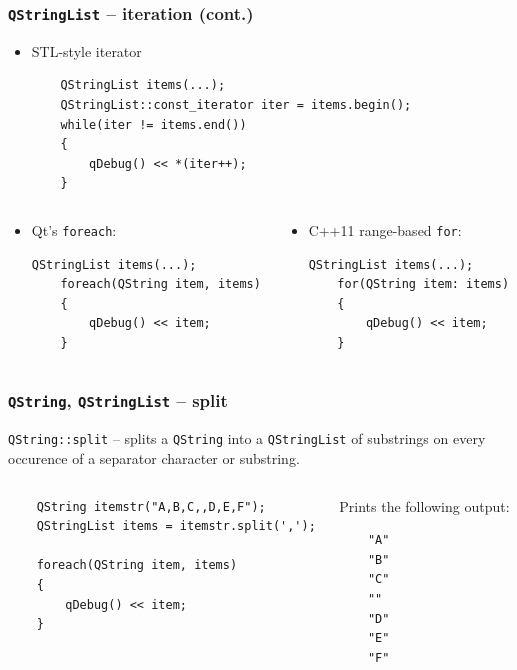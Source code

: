 \begin{frame}[fragile]
  \frametitle{\texttt{QStringList} -- iteration (cont.)}
  \small
  \begin{itemize}
    \item STL-style iterator
     \begin{lstlisting}
	QStringList items(...); 
	QStringList::const_iterator iter = items.begin();
	while(iter != items.end())
	{
	    qDebug() << *(iter++);
	}
     \end{lstlisting}
  \end{itemize}
  \begin{columns}
    \begin{column}{0.55\textwidth}
    \begin{itemize}
    \item Qt's \texttt{foreach}:
     \begin{lstlisting}[basicstyle=\scriptsize\ttfamily]
	QStringList items(...); 
	foreach(QString item, items)
	{
	    qDebug() << item;
	}
     \end{lstlisting}
    \end{itemize}
    \end{column}
    \begin{column}{0.47\textwidth}
    \begin{itemize}
    \item C++11 range-based \texttt{for}:
     \begin{lstlisting}[basicstyle=\scriptsize\ttfamily]
	QStringList items(...); 
	for(QString item: items)
	{
	    qDebug() << item;
	}
     \end{lstlisting}
    \end{itemize}
    \end{column}
  \end{columns}
\end{frame}

\begin{frame}[fragile]
  \frametitle{\texttt{QString}, \texttt{QStringList} -- split}
    \texttt{QString::split} -- splits a \texttt{QString} into a \texttt{QStringList}
     of substrings on every occurence of a separator character or substring.

    \vfill

    \begin{columns}
    \begin{column}{0.75\textwidth}
       \begin{lstlisting}
	QString itemstr("A,B,C,,D,E,F");
	QStringList items = itemstr.split(',');

	foreach(QString item, items)
	{
	    qDebug() << item;
	}
       \end{lstlisting}
    \end{column}
    \begin{column}{0.25\textwidth}
       \small
       Prints the following output:
       \begin{verbatim}
	"A"
	"B"
	"C"
	""
	"D"
	"E"
	"F"
       \end{verbatim}
    \end{column}
  \end{columns}
\end{frame}

